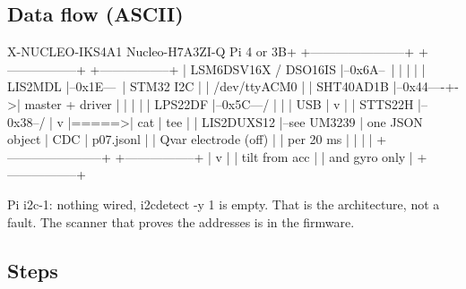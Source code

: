 \subsection*{Data flow (ASCII)}

\begin{asciiart}
  X-NUCLEO-IKS4A1                       Nucleo-H7A3ZI-Q          Pi 4 or 3B+
  +-----------------------+             +-----------------+      +-----------------+
  | LSM6DSV16X / DSO16IS  |--0x6A--\    |                 |      |                 |
  | LIS2MDL               |--0x1E---\   | STM32 I2C       |      | /dev/ttyACM0    |
  | SHT40AD1B             |--0x44----+->| master + driver |      |   |             |
  | LPS22DF               |--0x5C---/   |     |           | USB  |   v             |
  | STTS22H               |--0x38--/    |     v           |=====>| cat | tee       |
  | LIS2DUXS12            |--see UM3239 | one JSON object |  CDC |   p07.jsonl     |
  | Qvar electrode (off)  |             | per 20 ms       |      |   |             |
  +-----------------------+             +-----------------+      |   v             |
                                                                 | tilt from acc   |
                                                                 | and gyro only   |
                                                                 +-----------------+

  Pi i2c-1:  nothing wired, i2cdetect -y 1 is empty.  That is the architecture,
             not a fault.  The scanner that proves the addresses is in the firmware.
\end{asciiart}

\subsection*{Steps}

